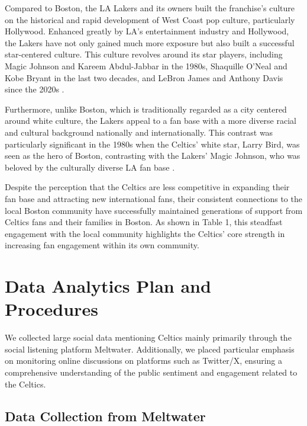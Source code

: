 \documentclass[
]{book}
\begin{document}
Compared to Boston, the LA Lakers and its owners built the franchise's culture on the historical and rapid development of West Coast pop culture, particularly Hollywood. Enhanced greatly by LA's entertainment industry and Hollywood, the Lakers have not only gained much more exposure but also built a successful star-centered culture. This culture revolves around its star players, including Magic Johnson and Kareem Abdul-Jabbar in the 1980s, Shaquille O'Neal and Kobe Bryant in the last two decades, and LeBron James and Anthony Davis since the 2020s \citep{hbo2023winningtime}.

Furthermore, unlike Boston, which is traditionally regarded as a city centered around white culture, the Lakers appeal to a fan base with a more diverse racial and cultural background nationally and internationally. This contrast was particularly significant in the 1980s when the Celtics' white star, Larry Bird, was seen as the hero of Boston, contrasting with the Lakers' Magic Johnson, who was beloved by the culturally diverse LA fan base \citep{hbo2023winningtime}.

Despite the perception that the Celtics are less competitive in expanding their fan base and attracting new international fans, their consistent connections to the local Boston community have successfully maintained generations of support from Celtics fans and their families in Boston. As shown in Table 1, this steadfast engagement with the local community highlights the Celtics' core strength in increasing fan engagement within its own community.

\hypertarget{data-analytics-plan-and-procedures}{%
\chapter{Data Analytics Plan and Procedures}\label{data-analytics-plan-and-procedures}}

We collected large social data mentioning Celtics mainly primarily through the social listening platform Meltwater. Additionally, we placed particular emphasis on monitoring online discussions on platforms such as Twitter/X, ensuring a comprehensive understanding of the public sentiment and engagement related to the Celtics.

\hypertarget{data-collection-from-meltwater}{%
\section{Data Collection from Meltwater}\label{data-collection-from-meltwater}}
\end{document}
